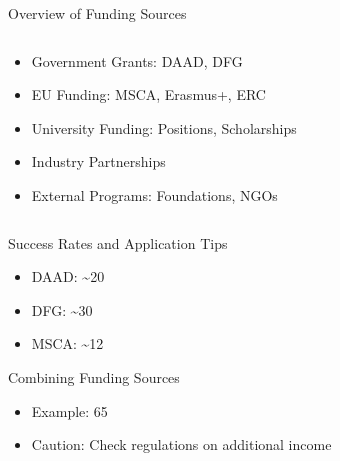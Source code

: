\documentclass[aspectratio=169,10pt]{beamer}
\begin{document}
\begin{frame}{Overview of Funding Sources}
\begin{columns}[T]
    \begin{column}{0.5\textwidth}
        \begin{itemize}
            \item Government Grants: DAAD, DFG
            \item EU Funding: MSCA, Erasmus+, ERC
            \item University Funding: Positions, Scholarships
            \item Industry Partnerships
            \item External Programs: Foundations, NGOs
        \end{itemize}
    \end{column}
    \begin{column}{0.5\textwidth}
    \end{column}
\end{columns}

\vspace{0.3cm}
\alert{Success Rates and Application Tips}
\begin{itemize}
    \item DAAD: \textasciitilde20%
    \item DFG: \textasciitilde30%
    \item MSCA: \textasciitilde12%
\end{itemize}

\alert{Combining Funding Sources}
\begin{itemize}
    \item Example: 65%
    \item Caution: Check regulations on additional income
\end{itemize}
\end{frame}
\end{document}
